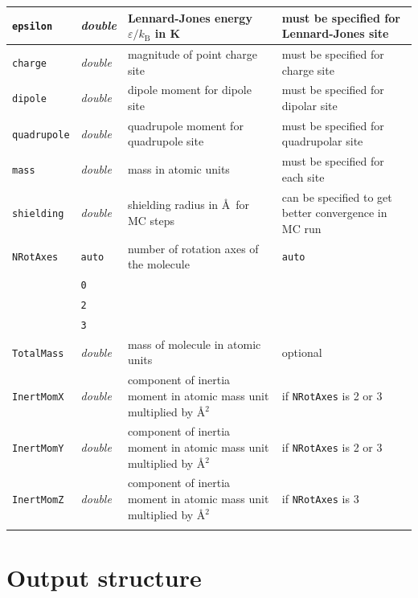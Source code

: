 \begin{landscape}
\begin{longtable}{llll}
	\texttt{epsilon} & \textit{double} & Lennard-Jones energy $\varepsilon/k_{\text{B}}$ in K & must be specified for Lennard-Jones site\\
	\hline
	\texttt{charge} & \textit{double} & magnitude of point charge site & must be specified for charge site \\
	\texttt{dipole} & \textit{double} & dipole moment for dipole site & must be specified for dipolar site \\
	\texttt{quadrupole} & \textit{double} & quadrupole moment for quadrupole site & must be specified for quadrupolar site \\
	\hline
	\texttt{mass} & \textit{double} & mass in atomic units & must be specified for each site \\
	\hline
	\texttt{shielding} &\textit{double} & shielding radius in \AA~for MC steps & can be specified to get better convergence in MC run\\
	\hline
	\texttt{NRotAxes} & \texttt{auto} & number of rotation axes of the molecule & \texttt{auto}\\
	& \texttt{0} & & \\
	& \texttt{2} & & \\
	& \texttt{3}& & \\
	\hline
	\texttt{TotalMass} &\textit{double} & mass of molecule in atomic units & optional \\
	\hline
	\texttt{InertMomX} &\textit{double}& component of inertia moment in atomic mass unit multiplied by \AA$^{2}$ & if \texttt{NRotAxes} is 2 or 3\\
	\texttt{InertMomY} &\textit{double} & component of inertia moment in atomic mass unit multiplied by \AA$^{2}$ & if \texttt{NRotAxes} is 2 or 3\\
	\texttt{InertMomZ} &\textit{double} & component of inertia moment in atomic mass unit multiplied by \AA$^{2}$ & if \texttt{NRotAxes} is 3\\

		\label{tab:pmFile_keywords}
	\end{longtable}
\end{landscape}
\renewcommand{\arraystretch}{1}








\section{Output structure}
\label{sec:Output structure}

